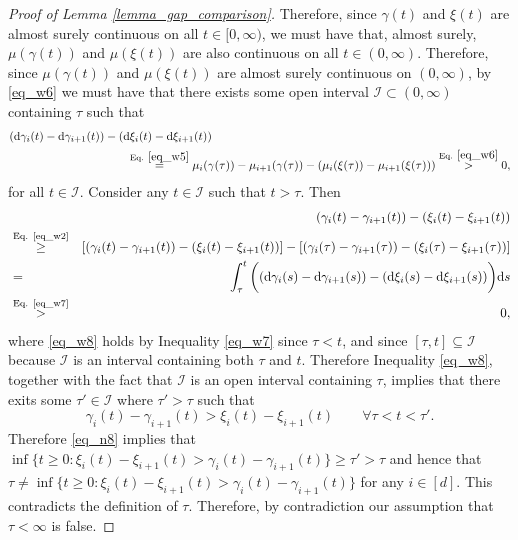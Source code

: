 \documentclass[11pt,letterpaper]{article}
\begin{document}
\begin{proof}[Proof of Lemma \ref{lemma_gap_comparison}]
%
Therefore, since $\gamma(t)$ and $\xi(t)$ are almost surely continuous on all $t\in [0,\infty)$,
%
we must have that, almost surely, $\mu(\gamma(t))$ and $\mu(\xi(t))$ are also continuous on all  $t\in(0,\infty)$. 
%
%
 Therefore, since $\mu(\gamma(t))$ and $\mu(\xi(t))$ are almost surely continuous on $(0,\infty)$, by \eqref{eq_w6}  we must have that there exists some open interval $\mathcal{I} \subset (0,\infty)$ containing $\tau$ such that
%
\begin{align}\label{eq_w7}
 &(\mathrm{d} \gamma_i(t) - \mathrm{d} \gamma_{i+1} (t))- (\mathrm{d} \xi_i(t) - \mathrm{d} \xi_{i+1} (t)) \nonumber\\
%
& \qquad \qquad \qquad  \qquad \qquad
 \stackrel{\textrm{Eq. } \eqref{eq_w5}}{=} \mu_i(\gamma(\tau)) - \mu_{i+1}(\gamma(\tau)) - (\mu_i(\xi(\tau)) - \mu_{i+1}(\xi(\tau))) \stackrel{\textrm{Eq. } \eqref{eq_w6}}{>} 0,  
\end{align}
for all $t \in \mathcal{I}$. 
%
Consider any $t \in \mathcal{I}$ such that $t > \tau$. 
%
 Then
%
\begin{eqnarray}
& & \!\!\!\!  \!\!\!\! \!\!\!\!\!\!\!\! \!\!\!\!  \!\!\!\! \!\!\!\!\!\!\!\! \!\!\!\!  \!\!\!\! \!\!\!\! (\gamma_i(t) -\gamma_{i+1} (t)) - (\xi_i(t) -  \xi_{i+1} (t)) \nonumber\\
%
    &\stackrel{\textrm{Eq. \eqref{eq_w2}}}{\geq}& [(\gamma_i(t) -\gamma_{i+1} (t)) - (\xi_i(t) -  \xi_{i+1} (t))] -   [(\gamma_i(\tau) -  \gamma_{i+1} (\tau)) - (\xi_i(\tau) -  \xi_{i+1} (\tau))] \nonumber\\
    &=&  \int_{\tau}^{t}  \bigg((\mathrm{d} \gamma_i(s) - \mathrm{d} \gamma_{i+1} (s))- (\mathrm{d} \xi_i(s) - \mathrm{d} \xi_{i+1} (s))\bigg) \mathrm{d}s \nonumber\\
    &\stackrel{\textrm{Eq. \eqref{eq_w7}}}{>}& 0, \label{eq_w8}
\end{eqnarray}
%
where \eqref{eq_w8} holds by Inequality \eqref{eq_w7} since $\tau < t$, and since  $[\tau, t] \subseteq \mathcal{I}$ because $\mathcal{I}$ is an interval containing both $\tau$ and $t$. 
%
Therefore Inequality \eqref{eq_w8}, together with the fact that $\mathcal{I}$ is an open interval containing $\tau$, implies that there exits some $\tau' \in \mathcal{I}$ where $\tau'>\tau$ such that 
%
\begin{equation}\label{eq_n8}
    \gamma_i(t) -\gamma_{i+1} (t) > \xi_i(t) -  \xi_{i+1} (t) \qquad \forall \tau<t <\tau'.
\end{equation}
%
Therefore \eqref{eq_n8} implies that  $\inf\{t\geq 0: \xi_i(t) - \xi_{i+1}(t) > \gamma_i(t) - \gamma_{i+1}(t)\} \geq \tau' >\tau$ and hence that $\tau \neq \inf\{t\geq 0: \xi_i(t) - \xi_{i+1}(t) > \gamma_i(t) - \gamma_{i+1}(t)\}$ for any $i \in [d]$.
%
This contradicts the definition of $\tau$.
%
Therefore, by contradiction our assumption that $\tau < \infty$ is false.



\end{proof}
\end{document}
